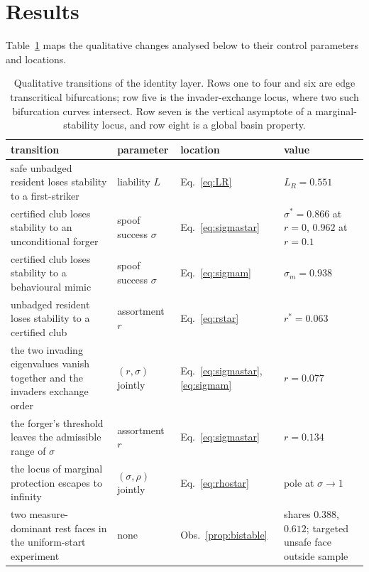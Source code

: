 \documentclass[a4paper,fleqn,longmktitle]{cas-sc}
\theoremstyle{plain}
\theoremstyle{definition}
\begin{document}


\section{Results}
\label{sec:results}


Table~\ref{tab:bifurcations} maps the qualitative changes analysed below to
their control parameters and locations.

\begin{table}[pos=t]
\centering
\caption{Qualitative transitions of the identity layer. Rows one to four and
six are edge transcritical bifurcations; row five is the invader-exchange
locus, where two such bifurcation curves intersect. Row seven is the vertical
asymptote of a marginal-stability locus, and row eight is a global basin
property.}
\label{tab:bifurcations}
\small
\vspace{2pt}
\begin{tabular}{@{}p{5.6cm}p{2.2cm}lp{3.6cm}@{}}
\toprule
transition & parameter & location & value \\
\midrule
safe unbadged resident loses stability to a first-striker
  & liability $L$
  & Eq.~\eqref{eq:LR}
  & $L_R = 0.551$ \\[2pt]
certified club loses stability to an unconditional forger
  & spoof success $\sigma$
  & Eq.~\eqref{eq:sigmastar}
  & $\sigma^{*} = 0.866$ at $r = 0$, $0.962$ at $r = 0.1$ \\[2pt]
certified club loses stability to a behavioural mimic
  & spoof success $\sigma$
  & Eq.~\eqref{eq:sigmam}
  & $\sigma_m = 0.938$ \\[2pt]
unbadged resident loses stability to a certified club
  & assortment $r$
  & Eq.~\eqref{eq:rstar}
  & $r^{*} = 0.063$ \\[2pt]
the two invading eigenvalues vanish together and the invaders exchange order
  & $(r, \sigma)$ jointly
  & Eq.~\eqref{eq:sigmastar}, \eqref{eq:sigmam}
  & $r = 0.077$ \\[2pt]
the forger's threshold leaves the admissible range of $\sigma$
  & assortment $r$
  & Eq.~\eqref{eq:sigmastar}
  & $r = 0.134$ \\[2pt]
the locus of marginal protection escapes to infinity
  & $(\sigma, \rho)$ jointly
  & Eq.~\eqref{eq:rhostar}
  & pole at $\sigma \to 1$ \\[2pt]
two measure-dominant rest faces in the uniform-start experiment
  & none
  & Obs.~\ref{prop:bistable}
  & shares $0.388$, $0.612$; targeted unsafe face outside sample \\
\bottomrule
\end{tabular}
\end{table}
\end{document}
